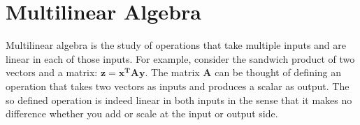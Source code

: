 \documentclass[12pt]{book}  %
\begin{document}


\chapter{Multilinear Algebra}
Multilinear algebra is the study of operations that take multiple inputs and are linear in each of those inputs. For example, consider the sandwich product of two vectors and a matrix: $\mathbf{z = x^T A y}$. The matrix $\mathbf{A}$ can be thought of defining an operation that takes two vectors as inputs and produces a scalar as output. The so defined operation is indeed linear in both inputs in the sense that it makes no difference whether you add or scale at the input or output side.
\end{document}

